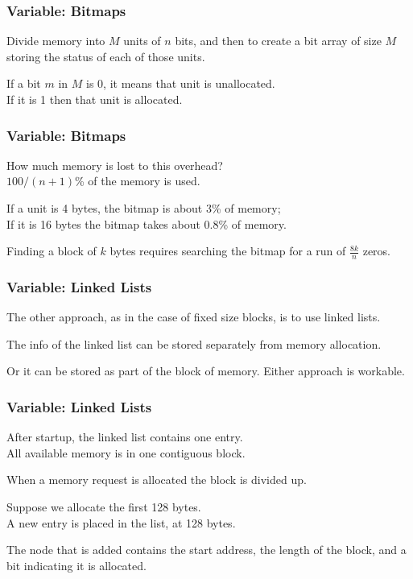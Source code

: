 \begin{frame}
\frametitle{Variable: Bitmaps}

Divide memory into $M$ units of $n$ bits, and then to create a bit array of size $M$ storing the status of each of those units. 

If a bit $m$ in $M$ is 0, it means that unit is unallocated.\\
If it is 1 then that unit is allocated. 

\end{frame}

\begin{frame}
\frametitle{Variable: Bitmaps}


How much memory is lost to this overhead?\\
\quad $100/(n+1)$\% of the memory is used. 

If a unit is 4 bytes, the bitmap is about 3\% of memory; \\
If it is 16 bytes the bitmap takes about 0.8\% of memory. 

Finding a block of $k$ bytes requires searching the bitmap for a run of $\frac{8k}{n}$ zeros.

\end{frame}

\begin{frame}
\frametitle{Variable: Linked Lists}

The other approach, as in the case of fixed size blocks, is to use linked lists. 

The info of the linked list can be stored separately from memory allocation.

Or it can be stored as part of the block of memory. Either approach is workable.

\end{frame}

\begin{frame}
\frametitle{Variable: Linked Lists}

After startup, the linked list contains one entry.\\
\quad  All available memory is in one contiguous block. 

When a memory request is allocated the block is divided up. 

Suppose we allocate the first 128 bytes.\\
\quad A new entry is placed in the list, at 128 bytes. 

The node that is added contains the start address, the length of the block, and a bit indicating it is allocated. 

\end{frame}

